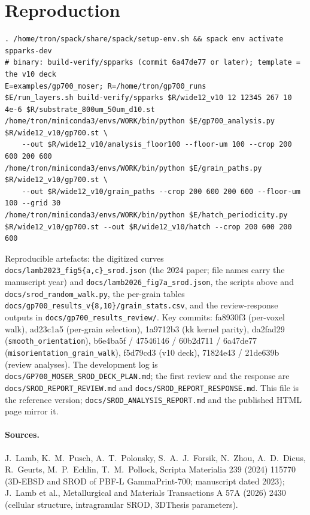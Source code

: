 \documentclass[11pt,a4paper]{article}
\newcommand{\code}[1]{\texttt{#1}}
\begin{document}
\section{Reproduction}
\begin{lstlisting}
. /home/tron/spack/share/spack/setup-env.sh && spack env activate spparks-dev
# binary: build-verify/spparks (commit 6a47de77 or later); template = the v10 deck
E=examples/gp700_moser; R=/home/tron/gp700_runs
$E/run_layers.sh build-verify/spparks $R/wide12_v10 12 12345 267 10 4e-6 $R/substrate_800um_50um_d10.st
/home/tron/miniconda3/envs/WORK/bin/python $E/gp700_analysis.py $R/wide12_v10/gp700.st \
    --out $R/wide12_v10/analysis_floor100 --floor-um 100 --crop 200 600 200 600
/home/tron/miniconda3/envs/WORK/bin/python $E/grain_paths.py $R/wide12_v10/gp700.st \
    --out $R/wide12_v10/grain_paths --crop 200 600 200 600 --floor-um 100 --grid 30
/home/tron/miniconda3/envs/WORK/bin/python $E/hatch_periodicity.py $R/wide12_v10/gp700.st --out $R/wide12_v10/hatch --crop 200 600 200 600
\end{lstlisting}
Reproducible artefacts: the digitized curves \code{docs/lamb2023\_fig5\{a,c\}\_srod.json} (the 2024 paper; file names carry the manuscript year) and \code{docs/lamb2026\_fig7a\_srod.json}, the scripts above and \code{docs/srod\_random\_walk.py}, the per-grain tables \code{docs/gp700\_results\_v\{8,10\}/grain\_stats.csv}, and the review-response outputs in \code{docs/gp700\_results\_review/}. Key commits: fa8930f3 (per-voxel walk), ad23c1a5 (per-grain selection), 1a9712b3 (kk kernel parity), da2fad29 (\code{smooth\_orientation}), b6e4ba5f / 47546146 / 60b2d711 / 6a47de77 (\code{misorientation\_grain\_walk}), f5d79cd3 (v10 deck), 71824e43 / 21de639b (review analyses). The development log is \code{docs/GP700\_MOSER\_SROD\_DECK\_PLAN.md}; the first review and the response are \code{docs/SROD\_REPORT\_REVIEW.md} and \code{docs/SROD\_REPORT\_RESPONSE.md}. This file is the reference version; \code{docs/SROD\_ANALYSIS\_REPORT.md} and the published HTML page mirror it.

\paragraph{Sources.} J.~Lamb, K.~M.~Pusch, A.~T.~Polonsky, S.~A.~J.~Forsik, N.~Zhou, A.~D.~Dicus, R.~Geurts, M.~P.~Echlin, T.~M.~Pollock, Scripta Materialia 239 (2024) 115770 (3D-EBSD and SROD of PBF-L GammaPrint-700; manuscript dated 2023); J.~Lamb et al., Metallurgical and Materials Transactions A 57A (2026) 2430 (cellular structure, intragranular SROD, 3DThesis parameters).
\end{document}
